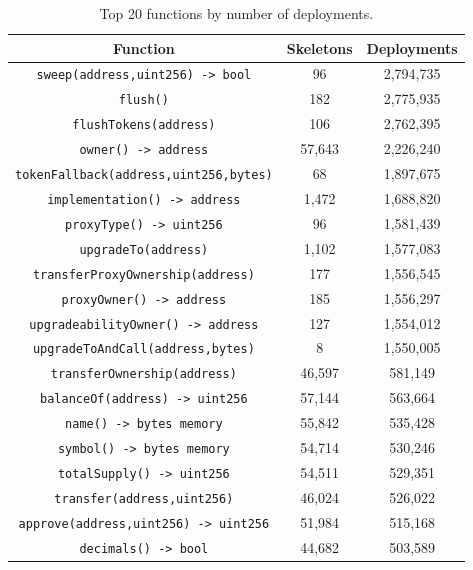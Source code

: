 \begin{table}[H]
\centering
    \begin{threeparttable}
    \begin{tabular}{ c c c } 
    \toprule
    \textbf{Function} & \textbf{Skeletons} & \textbf{Deployments}  \\
    \midrule
       \small{\tt sweep(address,uint256) -> bool} & 96 & 2,794,735\\ [1.2ex]
       \small{\tt flush()} & 182 & 2,775,935 \\ [1.2ex]
       \small{\tt flushTokens(address)} & 106 & 2,762,395 \\ [1.2ex]
       \small{\tt owner() -> address} & 57,643 & 2,226,240 \\ [1.2ex]
       \small{\tt tokenFallback(address,uint256,bytes)} & 68 & 1,897,675 \\ [1.2ex]
       \small{\tt implementation() -> address} & 1,472 & 1,688,820 \\ [1.2ex]
       \small{\tt proxyType() -> uint256} & 96 & 1,581,439 \\ [1.2ex]
       \small{\tt upgradeTo(address)} & 1,102 & 1,577,083 \\ [1.2ex]
       \small{\tt transferProxyOwnership(address)} & 177 & 1,556,545 \\ [1.2ex]
       \small{\tt proxyOwner() -> address} & 185 & 1,556,297 \\ [1.2ex]
       \small{\tt upgradeabilityOwner() -> address} & 127 & 1,554,012 \\ [1.2ex]
       \small{\tt upgradeToAndCall(address,bytes)} & 8 & 1,550,005 \\ [1.2ex]
       \small{\tt transferOwnership(address)} & 46,597 & 581,149 \\ [1.2ex]
       \small{\tt balanceOf(address) -> uint256} & 57,144 & 563,664 \\ [1.2ex]
       \small{\tt name() -> bytes memory} & 55,842 & 535,428 \\ [1.2ex]
       \small{\tt symbol() -> bytes memory} & 54,714 & 530,246 \\ [1.2ex]
       \small{\tt totalSupply() -> uint256} & 54,511 & 529,351 \\ [1.2ex]
       \small{\tt transfer(address,uint256)} & 46,024 & 526,022 \\ [1.2ex]
       \small{\tt approve(address,uint256) -> uint256} & 51,984 & 515,168 \\ [1.2ex]
       \small{\tt decimals() -> bool} & 44,682 & 503,589 \\ [1.2ex]
    \bottomrule
    \end{tabular}
    \end{threeparttable}
    \caption{Top 20 functions by number of deployments.}
    \label{table:top-functions}
\end{table}

